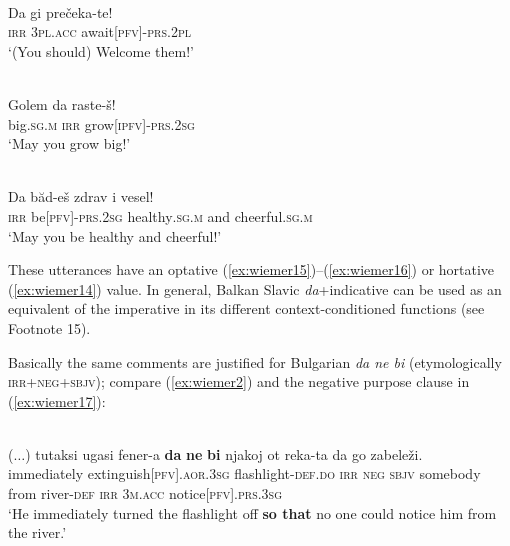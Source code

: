 \documentclass[output=paper,colorlinks,citecolor=brown]{langscibook}
\begin{document}
\ea
\label{ex:wiemer14} 
\\
\gll Da gi prečeka-te! \\
\textsc{irr} \textsc{3pl.acc} await\textsc{[pfv]-prs.2pl} \\
\glt `(You should) Welcome them!'
\z


\ea
\label{ex:wiemer15} 
\\
\gll Golem da raste-š! \\
big\textsc{.sg.m} \textsc{irr} grow\textsc{[ipfv]-prs.2sg} \\
\glt `May you grow big!'
\z

\ea
\label{ex:wiemer16} 
 \\
\gll Da băd-eš zdrav i vesel! \\
\textsc{irr} be\textsc{[pfv]-prs.2sg} healthy\textsc{.sg.m} and cheerful\textsc{.sg.m} \\
\glt `May you be healthy and cheerful!' \\

\z


\noindent These utterances have an optative (\ref{ex:wiemer15})--(\ref{ex:wiemer16}) or hortative (\ref{ex:wiemer14}) value. In general, Balkan Slavic \textit{da}+indicative can be used as an equivalent of the imperative in its different context-conditioned functions (see Footnote 15).


Basically the same comments are justified for Bulgarian \textit{da ne bi} (etymologically \textsc{irr+neg+sbjv}); compare (\ref{ex:wiemer2}) and the negative purpose clause in (\ref{ex:wiemer17}):


\ea
\label{ex:wiemer17} 
 \\
\gll \textnormal{($\ldots$)} tutaksi ugasi fener-a \textbf{da} \textbf{ne} \textbf{bi} njakoj ot reka-ta da go zabeleži.	\\
{} immediately extinguish\textsc{[pfv].aor.3sg} flashlight-\textsc{def.do} \textsc{irr} \textsc{neg} \textsc{sbjv} somebody from river-\textsc{def} \textsc{irr} \textsc{3m.acc} notice\textsc{[pfv].prs.3sg} \\
\glt `He immediately turned the flashlight off \textbf{so that} no one could notice him from the river.' \\
\z
\end{document}

